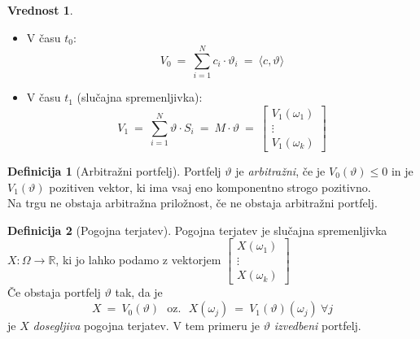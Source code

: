 \documentclass[11pt]{article}
\newcommand{\R}{\mathbb{R}}
\newcommand{\1}{\mathbbm{1}}
\theoremstyle{definition}
\newtheorem{definicija}{Definicija}[section]
\theoremstyle{definition}
\newtheorem{vrednost}{Vrednost}
\begin{document}
\begin{vrednost}
\vspace{0.5cm}
~\\
\begin{itemize}

	\item V času $t_0$:
	$$V_0 ~=~ \sum_{i=1}^N c_i \cdot \vartheta_i ~=~ \langle c, \vartheta \rangle$$
	
	\item V času $t_1$ (slučajna spremenljivka):
	$$V_1 ~=~ \sum_{i=1}^N \vartheta \cdot S_i ~=~ M \cdot \vartheta ~=~ \begin{bmatrix}
	V_1(\omega_1) \\
	\vdots \\
	V_1(\omega_k)
	\end{bmatrix}$$

\end{itemize}

\end{vrednost}
\vspace{0.5cm}

\begin{definicija}[Arbitražni portfelj]

Portfelj $\vartheta$ je \textit{arbitražni}, če je $V_0(\vartheta) \leq 0$ in je $V_1(\vartheta)$ pozitiven vektor, ki ima vsaj eno komponentno strogo pozitivno.\\

\noindent Na trgu ne obstaja arbitražna priložnost, če ne obstaja arbitražni portfelj.

\end{definicija}
\vspace{0.5cm}

\begin{definicija}[Pogojna terjatev]

Pogojna terjatev je slučajna spremenljivka $X: \Omega \rightarrow \R$, ki jo lahko podamo z vektorjem $\begin{bmatrix}
X(\omega_1) \\
\vdots \\
X(\omega_k)
\end{bmatrix}$ \\

\noindent Če obstaja portfelj $\vartheta$ tak, da je
$$X ~=~ V_0(\vartheta) ~~~\text{oz.}~~~ X(\omega_j) ~=~ V_1(\vartheta)(\omega_j) ~\forall j$$
je $X$ \textit{dosegljiva} pogojna terjatev. V tem primeru je $\vartheta$ \textit{izvedbeni} portfelj.

\end{definicija}
\vspace{0.5cm}
\end{document}
